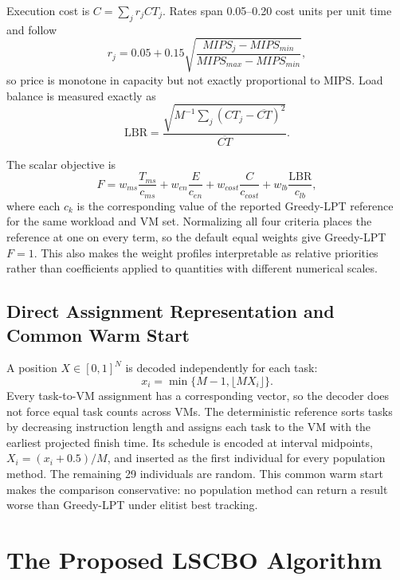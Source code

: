 \documentclass[pdflatex,onecolumn,sn-mathphys-num]{sn-jnl}
\begin{document}
Execution cost is $C=\sum_j r_jCT_j$. Rates span 0.05--0.20 cost units per unit time and follow
\begin{equation}
r_j=0.05+0.15\sqrt{\frac{MIPS_j-MIPS_{min}}{MIPS_{max}-MIPS_{min}}},
\end{equation}
so price is monotone in capacity but not exactly proportional to MIPS. Load balance is measured exactly as
\begin{equation}
\mathrm{LBR}=\frac{\sqrt{M^{-1}\sum_j(CT_j-\overline{CT})^2}}{\overline{CT}}.
\end{equation}

The scalar objective is
\begin{equation}
F=w_{ms}\frac{T_{ms}}{c_{ms}}+w_{en}\frac{E}{c_{en}}+w_{cost}\frac{C}{c_{cost}}+w_{lb}\frac{\mathrm{LBR}}{c_{lb}},
\end{equation}
where each $c_k$ is the corresponding value of the reported Greedy-LPT reference for the same workload and VM set. Normalizing all four criteria places the reference at one on every term, so the default equal weights give Greedy-LPT $F=1$. This also makes the weight profiles interpretable as relative priorities rather than coefficients applied to quantities with different numerical scales.

\subsection{Direct Assignment Representation and Common Warm Start}
A position $X\in[0,1]^N$ is decoded independently for each task:
\begin{equation}
x_i=\min\{M-1,\lfloor MX_i\rfloor\}.
\end{equation}
Every task-to-VM assignment has a corresponding vector, so the decoder does not force equal task counts across VMs. The deterministic reference sorts tasks by decreasing instruction length and assigns each task to the VM with the earliest projected finish time. Its schedule is encoded at interval midpoints, $X_i=(x_i+0.5)/M$, and inserted as the first individual for every population method. The remaining 29 individuals are random. This common warm start makes the comparison conservative: no population method can return a result worse than Greedy-LPT under elitist best tracking.

\section{The Proposed LSCBO Algorithm}\label{sec:algorithm}
\end{document}
